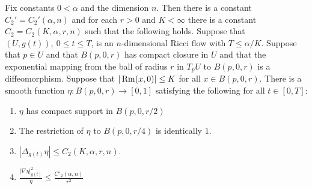 \begin{proposition}\label{prop:parabolic-cutoff-function}

\label{etaprop}

Fix constants $0<\alpha$ and the dimension $n$. Then there is a constant
$C_2'=C_2'(\alpha,n)$ and for each $r>0$ and $K<\infty$ there is a constant
$C_2=C_2(K,\alpha,r,n)$ such that the following holds. Suppose that $(U,g(t)),\
0\le t\le T$,  is an $n$-dimensional Ricci flow  with $T\le \alpha/K$. Suppose
that $p\in U$ and that $B(p,0,r)$ has compact closure in $U$ and that the
exponential mapping from the ball of radius $r$ in $T_pU$ to $B(p,0,r)$ is a
diffeomorphism. Suppose that $|\operatorname{Rm}(x,0)|\le K$ for all $x\in B(p,0,r)$. There is
a smooth function $\eta\colon B(p,0,r)\to [0,1]$ satisfying the following for
all $t\in [0,T]$:
\begin{enumerate}
\item $\eta$ has compact support in $B(p,0,r/2)$
\item The restriction of $\eta$ to $B(p,0,r/4)$ is identically $1$.
\item $|\Delta_{g(t)} \eta|\le C_2(K,\alpha,r,n)$.
\item $\frac{|\nabla \eta|_{g(t)}^2}{\eta}\le \frac{C'_2(\alpha,n)}{r^2}$
\end{enumerate}
\end{proposition}


